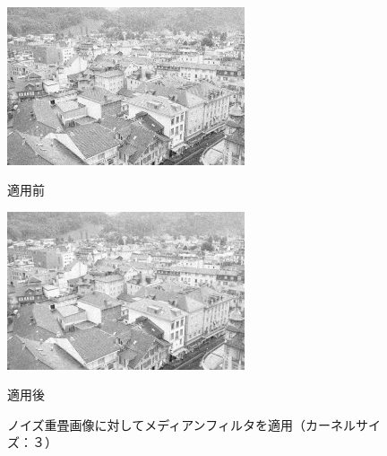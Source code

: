 \documentclass{jsarticle}
\begin{document}
\begin{figure}[htbp]
 \begin{minipage}{0.5\hsize}
  \begin{center}
   \includegraphics[width=70mm]{town_noise.png}
  \end{center}
  \caption{適用前}
  \label{fig:one}
 \end{minipage}
 \begin{minipage}{0.5\hsize}
  \begin{center}
   \includegraphics[width=70mm]{output_median_noise_3.png}
  \end{center}
  \caption{適用後}
  \label{fig:two}
 \end{minipage}
 \caption{ノイズ重畳画像に対してメディアンフィルタを適用（カーネルサイズ：３）}
\end{figure}
\end{document}
